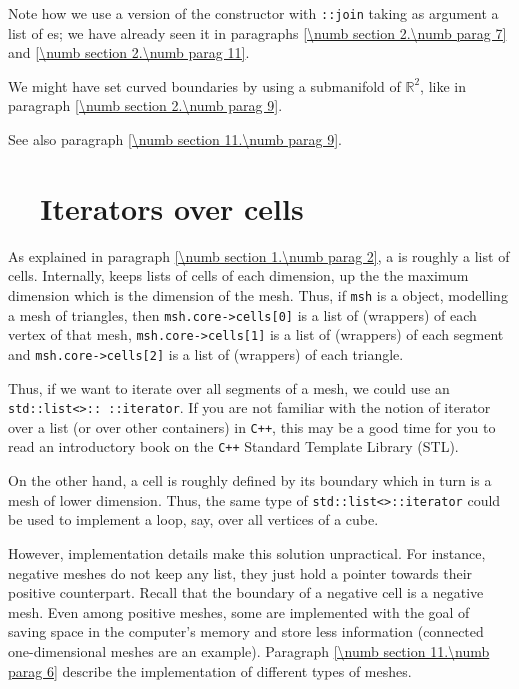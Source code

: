 Note how we use a version of the {\small\tt {}} constructor with {\small\tt {}::join}
taking as argument a list of {\small\tt {}}es; we have already seen it in paragraphs
\ref{\numb section 2.\numb parag 7} and \ref{\numb section 2.\numb parag 11}.

We might have set curved boundaries by using a submanifold of $ \mathbb{R}^2 $, like in paragraph
\ref{\numb section 2.\numb parag 9}.

See also paragraph \ref{\numb section 11.\numb parag 9}.


\section{~~Iterators over cells}\label{\numb section 9.\numb parag 3}

As explained in paragraph \ref{\numb section 1.\numb parag 2}, a {\small\tt {}} is
roughly a list of cells.
Internally, {\maniFEM} keeps lists of cells of each dimension, up the the maximum
dimension which is the dimension of the mesh.
Thus, if {\small\tt msh} is a {\small\tt {}} object, modelling a
mesh of triangles, then {\small\tt msh.core->cells[0]} is a list of (wrappers) of
each vertex of that mesh, {\small\tt msh.core->cells[1]} is a list of (wrappers) of
each segment and {\small\tt msh.core->cells[2]} is a list of (wrappers) of each triangle.

Thus, if we want to iterate over all segments of a mesh, we could use an
{\small\tt std::list<>:: ::iterator}.
If you are not familiar with the notion of iterator over a list (or over other containers)
in {\tt C++}, this may be a good time for you to read an introductory book on the
{\tt C++} Standard Template Library (STL).

On the other hand, a cell is roughly defined by its boundary which in turn is a mesh of
lower dimension.
Thus, the same type of {\small\tt std::list<>::iterator} could be used to
implement a loop, say, over all vertices of a cube.

However, implementation details make this solution unpractical.
For instance, negative meshes do not keep any list,
they just hold a pointer towards their positive counterpart.
Recall that the boundary of a negative cell is a negative mesh.
Even among positive meshes, some are implemented with the goal of saving space in the
computer's memory and store less information (connected one-dimensional meshes are an
example).
Paragraph \ref{\numb section 11.\numb parag 6} describe the implementation of different
types of meshes.


